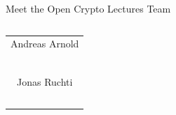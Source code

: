 \documentclass[handout]{beamer}
\begin{document}
\begin{frame}{Meet the Open Crypto Lectures Team}
\begin{columns}[T]
\begin{column}{0.31\textwidth}
\begin{table}
\begin{tabular}{c}
					Andreas Arnold\\
					\href{https://www.linkedin.com/in/andreas-arnold-170a20225/}{\faLinkedinSquare}\ \href{}{\faTwitterSquare}\\
					\vspace{0.5em}\\
					Jonas Ruchti\\
					\href{https://www.linkedin.com/in/jonas-ruchti-a29042221/}{\faLinkedinSquare}\ \href{https://twitter.com/jonas_ruchti}{\faTwitterSquare}\\
				\end{tabular}
			\end{table}
		\end{column}
	\end{columns}
\end{frame}
\end{document}
